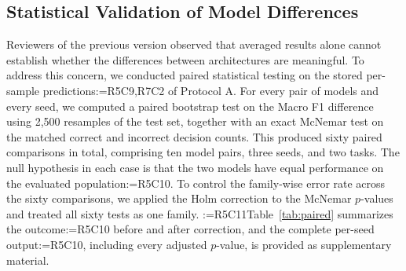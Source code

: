 \documentclass[a4paper,fleqn]{cas-sc}
\makeatletter
\newif\iftracked
\newcommand{\rv@setcolour}[1]{%
  \IfStrEq{#1}{R7C7}{\color{rvEdit}}{%
    \IfSubStr{#1}{R5}{\IfSubStr{#1}{R7}{\color{rvBoth}}{\color{rvFive}}}{\color{rvSeven}}}}
\newcommand{\rv@tag}[1]{\textsuperscript{\sffamily\bfseries\scriptsize[\StrSubstitute{#1}{,}{, }]}\,}
\newcommand{\rv@recordone}[1]{%
  \edef\rv@i{#1}%
  \ifcsdef{rv@n@\rv@i}{}{\csgdef{rv@n@\rv@i}{0}}%
  \csxdef{rv@n@\rv@i}{\the\numexpr\csuse{rv@n@\rv@i}+1\relax}%
  \begingroup\edef\@currentlabel{\rv@i}\label{rv:\rv@i:\csuse{rv@n@\rv@i}}\endgroup}
\newcommand{\rv@record}[1]{\@for\rv@id:=#1\do{\expandafter\rv@recordone\expandafter{\rv@id}}}
\DeclareRobustCommand{\rc}[2]{\rv@record{#1}\iftracked{\rv@setcolour{#1}\rv@tag{#1}#2}\else#2\fi}
\DeclareRobustCommand{\rcrep}[3]{\rv@record{#1}\iftracked{\rv@setcolour{#1}\rv@tag{#1}\rv@strike{#2} #3}\else#3\fi}
\makeatother
\begin{document}
\subsection{Statistical Validation of Model Differences}
\label{sec:stats}
Reviewers of the previous version observed that averaged results alone cannot establish whether the differences between architectures are meaningful. To address this concern, we conducted paired statistical testing on the stored per-sample predictions\rc{R5C9,R7C2}{ of Protocol A}. For every pair of models and every seed, we computed a paired bootstrap test on the Macro F1 difference using 2,500 resamples of the test set, together with an exact McNemar test on the matched correct and incorrect decision counts. This produced sixty paired comparisons in total, comprising ten model pairs, three seeds, and two tasks. The null hypothesis in each case is that the two models have equal performance on the evaluated population\rcrep{R5C10}{, and no correction for multiple comparisons was applied because the tests are reported as a descriptive stability analysis rather than as a family-wise confirmatory procedure.}{. To control the family-wise error rate across the sixty comparisons, we applied the Holm correction \citep{holm1979simple} to the McNemar $p$-values and treated all sixty tests as one family.} \rcrep{R5C11}{Table 9}{Table~\ref{tab:paired}} summarizes the outcome\rc{R5C10}{ before and after correction}, and the complete per-seed output\rc{R5C10}{, including every adjusted $p$-value,} is provided as supplementary material.
\end{document}
